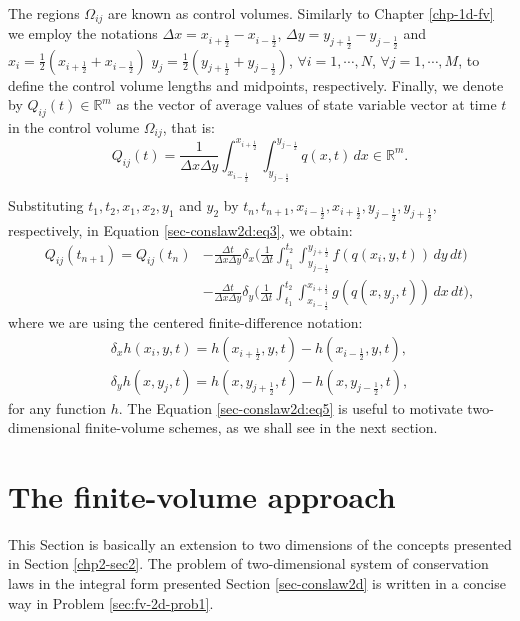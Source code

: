 The regions $\Omega_{ij}$ are known as control volumes. 
Similarly to  Chapter \ref{chp-1d-fv} we employ the notations
$\Delta x = x_{i+\frac{1}{2}} - x_{i-\frac{1}{2}}$,
$\Delta y = y_{j+\frac{1}{2}} - y_{j-\frac{1}{2}}$ 
and $x_i = \frac{1}{2}(x_{i+\frac{1}{2}} + x_{i-\frac{1}{2}})$
$y_j = \frac{1}{2}(y_{j+\frac{1}{2}} + y_{j-\frac{1}{2}})$, $\forall i = 1, \cdots, N$, 
$\forall j = 1, \cdots, M$,
to define the control volume lengths and midpoints, respectively.
Finally, we denote by ${Q}_{ij}(t) \in \mathbb{R}^m$ as the vector of 
average values of state variable vector at time $t$
in the control volume $\Omega_{ij}$, that is:
\begin{equation}
	\label{sec-conslaw2d:eq4}
	{Q}_{ij}(t) = \frac{1}{\Delta x \Delta y}
	\int_{x_{i-\frac{1}{2}}}^{x_{i+\frac{1}{2}}} \int_{y_{j-\frac{1}{2}}}^{y_{j-\frac{1}{2}}} {q}(x,t) \,dx
	\in \mathbb{R}^m.
\end{equation}

Substituting $t_1, t_2, x_1, x_2, y_1$ and $y_2$ by 
$t_{n}, t_{n+1}, x_{i-\frac{1}{2}}, x_{i+\frac{1}{2}}, y_{j-\frac{1}{2}}, y_{j+\frac{1}{2}}$,
respectively, in Equation \eqref{sec-conslaw2d:eq3}, we obtain:
\begin{align}
	\label{sec-conslaw2d:eq5}
	{Q}_{ij}(t_{n+1})  = {Q}_{ij}(t_{n})
	&- \frac{\Delta t}{\Delta x \Delta y}
	\delta _x \bigg( \frac{1}{\Delta t}
	\int_{t_1}^{t_2} \int_{y_{j-\frac{1}{2}}}^{y_{j+\frac{1}{2}}} 
	{f}({q}(x_{i}, y, t))
	\,dy \,dt \bigg) \\ \nonumber
	&- \frac{\Delta t}{\Delta x \Delta y}
	\delta _y \bigg( \frac{1}{\Delta t}
	\int_{t_1}^{t_2} \int_{x_{i-\frac{1}{2}}}^{x_{i+\frac{1}{2}}} 
	{g}({q}(x, y_{j}, t))
	\,dx \,dt \bigg),
\end{align}
where we are using the centered finite-difference notation:
\begin{align}
	\label{sec-conslaw2d:eq6}
	\delta_x {h}(x_i,y, t) = 
	{h}(x_{i+\frac{1}{2}}, y, t) - 
	{h}(x_{i-\frac{1}{2}}, y, t), \\
	\delta_y {h}(x, y_j,t) = 
    {h}(x, y_{j+\frac{1}{2}},t) - 
    {h}(x, y_{j-\frac{1}{2}},t),
\end{align}
for any function ${h}$. The Equation \eqref{sec-conslaw2d:eq5} is useful to
motivate two-dimensional finite-volume schemes, as we shall see in the next section.

\section{The finite-volume approach}
\label{sec:fv-2d}
This Section is basically an extension to two dimensions 
of the concepts presented in Section \ref{chp2-sec2}.
The problem of two-dimensional system of conservation laws in the integral form 
presented Section \ref{sec-conslaw2d} is written in a concise way in Problem \ref{sec:fv-2d-prob1}.

